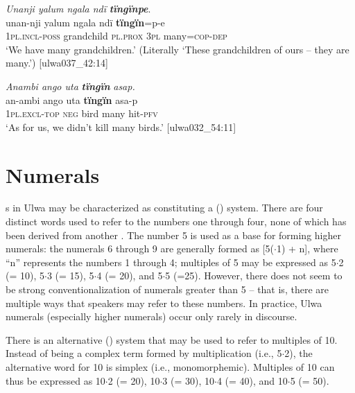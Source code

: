\ea%
    \label{ex:det:213}
          \textit{Unanji yalum ngala ndï} \textbf{\textit{tïngïnpe}}.\\
\gll unan-nji    yalum    ngala    ndï  \textbf{tïngïn}=p-e\\
    1\textsc{pl.incl-poss}  grandchild  \textsc{pl.prox}  3\textsc{pl}  many=\textsc{cop{}-dep}\\
\glt `We have many grandchildren.’ (Literally ‘These grandchildren of ours – they are many.’) [ulwa037\_42:14]
\z

\ea%
    \label{ex:det:214}
          \textit{Anambi ango uta} \textbf{\textit{tïngïn}} \textit{asap.}\\
\gll    an-ambi    ango  uta    \textbf{tïngïn}  asa-p\\
    1\textsc{pl.excl-top}  \textsc{neg}  bird  many  hit-\textsc{pfv}\\
\glt `As for us, we didn’t kill many birds.’ [ulwa032\_54:11]
\z

\section{Numerals}\label{sec:7.5}


s in Ulwa may be characterized as constituting a   ()  system. There are four distinct words used to refer to the numbers one through four, none of which has been derived from another . The number 5 is used as a base for forming higher numerals: the numerals 6 through 9 are generally formed as [5(${\cdot}$1) + n], where “n” represents the numbers 1 through 4; multiples of 5 may be expressed as 5${\cdot}$2 (= 10), 5${\cdot}$3 (= 15), 5${\cdot}$4 (= 20), and 5${\cdot}$5 (=25). However, there does not seem to be strong conventionalization of numerals greater than 5 -- that is, there are multiple ways that speakers may refer to these numbers. In practice, Ulwa numerals (especially higher numerals) occur only rarely in discourse.

There is an alternative   ()  system that may be used to refer to multiples of 10. Instead of being a complex term formed by multiplication (i.e., 5${\cdot}$2), the alternative word for 10 is simplex (i.e., monomorphemic). Multiples of 10 can thus be expressed as 10${\cdot}$2 (= 20), 10${\cdot}$3 (= 30), 10${\cdot}$4 (= 40), and 10${\cdot}$5 (= 50).

